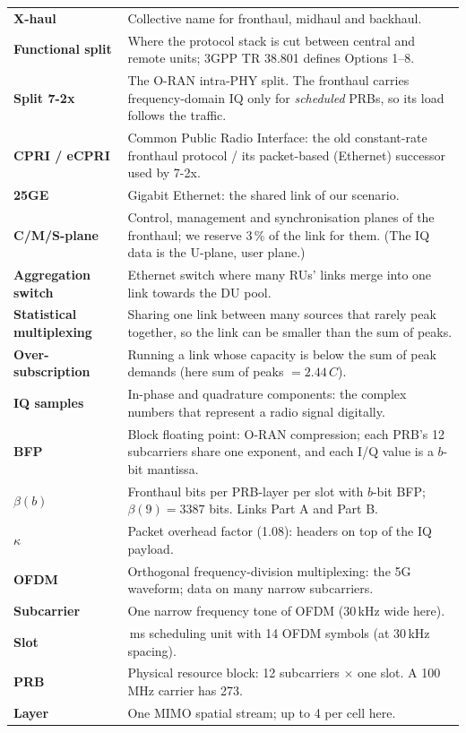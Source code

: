 \documentclass[11pt,a4paper]{article}
\begin{document}
\begin{longtable}{>{\raggedright\arraybackslash\bfseries}p{3.6cm}>{\raggedright\arraybackslash}p{12.2cm}}
X-haul & Collective name for fronthaul, midhaul and backhaul. \\
Functional split & Where the protocol stack is cut between central and remote units; 3GPP TR 38.801 defines Options 1--8. \\
Split 7-2x & The O-RAN intra-PHY split. The fronthaul carries frequency-domain IQ only for \emph{scheduled} PRBs, so its load follows the traffic. \\
CPRI / eCPRI & Common Public Radio Interface: the old constant-rate fronthaul protocol / its packet-based (Ethernet) successor used by 7-2x. \\
25GE & 25 Gigabit Ethernet: the shared link of our scenario. \\
C/M/S-plane & Control, management and synchronisation planes of the fronthaul; we reserve 3\,\% of the link for them. (The IQ data is the U-plane, user plane.) \\
Aggregation switch & Ethernet switch where many RUs' links merge into one link towards the DU pool. \\
Statistical multiplexing & Sharing one link between many sources that rarely peak together, so the link can be smaller than the sum of peaks. \\
Over-subscription & Running a link whose capacity is below the sum of peak demands (here sum of peaks $= 2.44\,C$). \\
IQ samples & In-phase and quadrature components: the complex numbers that represent a radio signal digitally. \\
BFP & Block floating point: O-RAN compression; each PRB's 12 subcarriers share one exponent, and each I/Q value is a $b$-bit mantissa. \\
$\beta(b)$ & Fronthaul bits per PRB-layer per slot with $b$-bit BFP; $\beta(9) = 3387$ bits. Links Part A and Part B. \\
$\kappa$ & Packet overhead factor (1.08): headers on top of the IQ payload. \\
OFDM & Orthogonal frequency-division multiplexing: the 5G waveform; data on many narrow subcarriers. \\
Subcarrier & One narrow frequency tone of OFDM (30\,kHz wide here). \\
Slot & 0.5\,ms scheduling unit with 14 OFDM symbols (at 30\,kHz spacing). \\
PRB & Physical resource block: 12 subcarriers $\times$ one slot. A 100\,MHz carrier has 273. \\
Layer & One MIMO spatial stream; up to 4 per cell here. \\

\end{longtable}
\end{document}
